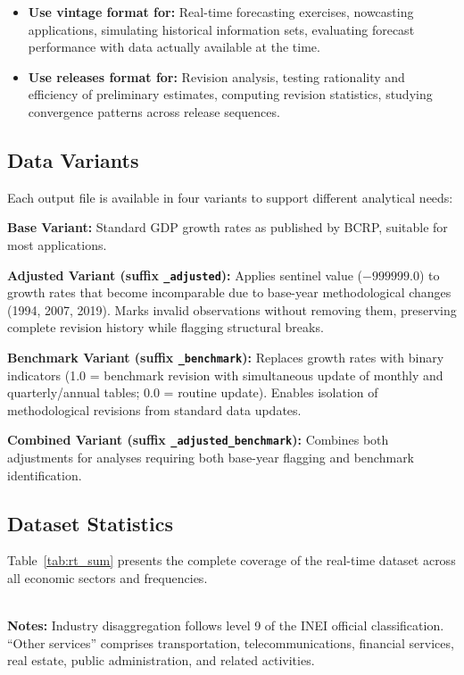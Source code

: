 \documentclass[12pt]{article}
\begin{document}
\begin{itemize}
    \item \textbf{Use vintage format for:} Real-time forecasting exercises, nowcasting applications, simulating
historical information sets, evaluating forecast performance with data actually available at the time.
    \item \textbf{Use releases format for:} Revision analysis, testing rationality and efficiency of preliminary
estimates, computing revision statistics, studying convergence patterns across release sequences.
\end{itemize}

\subsection*{Data Variants}

Each output file is available in four variants to support different analytical needs:

\textbf{Base Variant:} Standard GDP growth rates as published by BCRP, suitable for most applications.

\textbf{Adjusted Variant (suffix \texttt{\_adjusted}):} Applies sentinel value ($-999999.0$) to growth rates that become incomparable due to base-year methodological changes (1994, 2007, 2019). Marks invalid observations without removing them, preserving complete revision history while flagging structural breaks.

\textbf{Benchmark Variant (suffix \texttt{\_benchmark}):} Replaces growth rates with binary indicators (1.0 = benchmark revision with simultaneous update of monthly and quarterly/annual tables; 0.0 = routine update). Enables isolation of methodological revisions from standard data updates.

\textbf{Combined Variant (suffix \texttt{\_adjusted\_benchmark}):} Combines both adjustments for analyses requiring both base-year flagging and benchmark identification.

\subsection*{Dataset Statistics}

Table~\ref{tab:rt_sum} presents the complete coverage of the real-time dataset across all economic sectors and frequencies.

\begin{table}[t!]
\caption{Sectoral GDP coverage in the real-time dataset}
\label{tab:rt_sum}
\centering
\resizebox{\textwidth}{!}{

}\\[2mm]
\footnotesize \textbf{Notes:} Industry disaggregation follows level 9 of the INEI official classification. ``Other
services'' comprises transportation, telecommunications, financial services, real estate, public administration, and
related activities.
\end{table}
\end{document}
